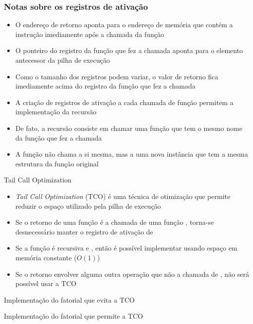 \begin{frame}

    \frametitle{Notas sobre os registros de ativação}

    \begin{itemize}
        \item O {endereço de retorno} aponta para o endereço de 
        memória que contém a instrução {imediamente após} a chamada 
        da função
        

        \item O {ponteiro} do registro da função que 
        fez a chamada aponta para o elemento {antecessor}
        da {pilha} de execução
        


        \item Como o {tamanho} dos registros podem variar, o 
        {valor de retorno} fica imediamente acima do registro da 
        função que {fez a chamada}

        \item A criação de {registros de ativação} a cada chamada de 
        função permitem a implementação da {recursão}
        
        \item De fato, a {recursão} consiste em chamar uma função 
        que tem o {mesmo nome} da função que fez a chamada
        
        \item A função não chama a {si mesma}, mas a uma nova 
        instância que tem a {mesma estrutura} da função original

    \end{itemize}

\end{frame}

\begin{frame}[fragile]{Tail Call Optimization}

    \begin{itemize}
        \item \textit{Tail Call Optimization} (TCO) é uma técnica de otimização que permite
            reduzir o espaço utilizado pela pilha de execução

        \item Se o retorno de uma função  é a chamada de uma função ,
            torna-se desnecessário manter o registro de ativação de 

        \item Se a função é recursiva e , então é possível implementar  
            usando espaço em memória constante ($O(1)$)

        \item Se o retorno envolver alguma outra operação que não a chamada de , não 
            será possível usar a TCO
    \end{itemize}

\end{frame}

\begin{frame}[fragile]{Implementação do fatorial que evita a TCO}
\end{frame}

\begin{frame}[fragile]{Implementação do fatorial que permite a TCO}
\end{frame}

